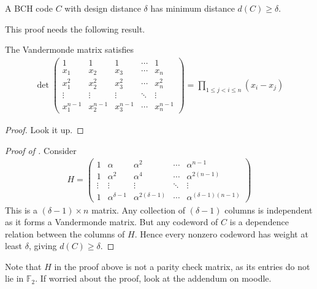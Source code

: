 \begin{theorem} \label{thm:14.3}
    A BCH code $C$ with design distance $\delta$ has minimum distance $d(C) \geq \delta$.
\end{theorem}

This proof needs the following result.

\begin{lemma}
    The Vandermonde matrix satisfies
    \begin{align*}
        \det \begin{pmatrix}
            1 & 1 & 1 & \cdots & 1 \\
            x_1 & x_2 & x_3 & \cdots & x_n \\
            x_1^2 & x_2^2 & x_3^2 & \cdots & x_n^2 \\
            \vdots & \vdots & \vdots & \ddots & \vdots \\
            x_1^{n-1} & x_2^{n-1} & x_3^{n-1} & \cdots & x_n^{n-1}
        \end{pmatrix} = \prod_{1 \leq j < i \leq n} (x_i - x_j)
    \end{align*}
\end{lemma}

\begin{proof}
    Look it up.
\end{proof}

\begin{proof}[Proof of ]
    Consider
    \begin{align*}
        H = \begin{pmatrix}
            1 & \alpha & \alpha^2 & \cdots & \alpha^{n-1} \\
            1 & \alpha^2 & \alpha^4 & \cdots & \alpha^{2(n-1)} \\
            \vdots & \vdots & \vdots & \ddots & \vdots \\
            1 & \alpha^{\delta - 1} & \alpha^{2(\delta - 1)} & \cdots & \alpha^{(\delta - 1)(n-1)}
        \end{pmatrix}
    \end{align*}
    This is a $(\delta - 1) \times n$ matrix.
    Any collection of $(\delta - 1)$ columns is independent as it forms a Vandermonde matrix.
    But any codeword of $C$ is a dependence relation between the columns of $H$.
    Hence every nonzero codeword has weight at least $\delta$, giving $d(C) \geq \delta$.
\end{proof}

Note that $H$ in the proof above is not a parity check matrix, as its entries do not lie in $\mathbb F_2$.
If worried about the proof, look at the addendum on moodle.

